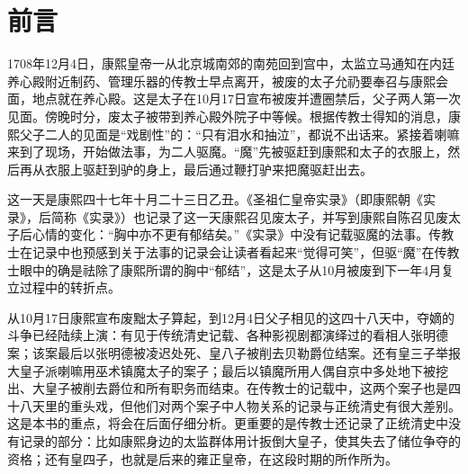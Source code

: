 \chapter*{前言}

1708年12月4日，康熙皇帝一从北京城南郊的南苑回到宫中，太监立马通知在内廷养心殿附近制药、管理乐器的传教士早点离开，被废的太子允礽要奉召与康熙会面，地点就在养心殿。这是太子在10月17日宣布被废并遭圈禁后，父子两人第一次见面。傍晚时分，废太子被带到养心殿外院子中等候。根据传教士得知的消息，康熙父子二人的见面是“戏剧性”的：“只有泪水和抽泣”，都说不出话来。紧接着喇嘛来到了现场，开始做法事，为二人驱魔。“魔”先被驱赶到康熙和太子的衣服上，然后再从衣服上驱赶到驴的身上，最后通过鞭打驴来把魔驱赶出去。



这一天是康熙四十七年十月二十三日乙丑。《圣祖仁皇帝实录》（即康熙朝《实录》，后简称《实录》）也记录了这一天康熙召见废太子，并写到康熙自陈召见废太子后心情的变化：“胸中亦不更有郁结矣。”《实录》中没有记载驱魔的法事。传教士在记录中也预感到关于法事的记录会让读者看起来“觉得可笑”，但驱“魔”在传教士眼中的确是祛除了康熙所谓的胸中“郁结”，这是太子从10月被废到下一年4月复立过程中的转折点。



从10月17日康熙宣布废黜太子算起，到12月4日父子相见的这四十八天中，夺嫡的斗争已经陆续上演：有见于传统清史记载、各种影视剧都演绎过的看相人张明德案；该案最后以张明德被凌迟处死、皇八子被削去贝勒爵位结案。还有皇三子举报大皇子派喇嘛用巫术镇魔太子的案子；最后以镇魔所用人偶自京中多处地下被挖出、大皇子被削去爵位和所有职务而结束。在传教士的记载中，这两个案子也是四十八天里的重头戏，但他们对两个案子中人物关系的记录与正统清史有很大差别。这是本书的重点，将会在后面仔细分析。更重要的是传教士还记录了正统清史中没有记录的部分：比如康熙身边的太监群体用计扳倒大皇子，使其失去了储位争夺的资格；还有皇四子，也就是后来的雍正皇帝，在这段时期的所作所为。



